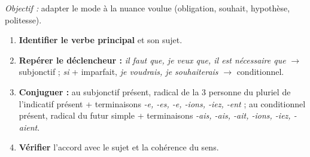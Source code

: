 \documentclass[11pt]{article}
\begin{document}
\begin{methode}
\emph{Objectif :} adapter le mode à la nuance voulue (obligation, souhait, hypothèse, politesse).
\begin{enumerate}
  \item \textbf{Identifier le verbe principal} et son sujet.
  \item \textbf{Repérer le déclencheur :} \emph{il faut que, je veux que, il est nécessaire que} $\rightarrow$ subjonctif ; \emph{si} + imparfait, \emph{je voudrais, je souhaiterais} $\rightarrow$ conditionnel.
  \item \textbf{Conjuguer :} au subjonctif présent, radical de la 3 personne du pluriel de l'indicatif présent + terminaisons \emph{-e, -es, -e, -ions, -iez, -ent} ; au conditionnel présent, radical du futur simple + terminaisons \emph{-ais, -ais, -ait, -ions, -iez, -aient}.
  \item \textbf{Vérifier} l'accord avec le sujet et la cohérence du sens.
\end{enumerate}
\end{methode}
\end{document}
